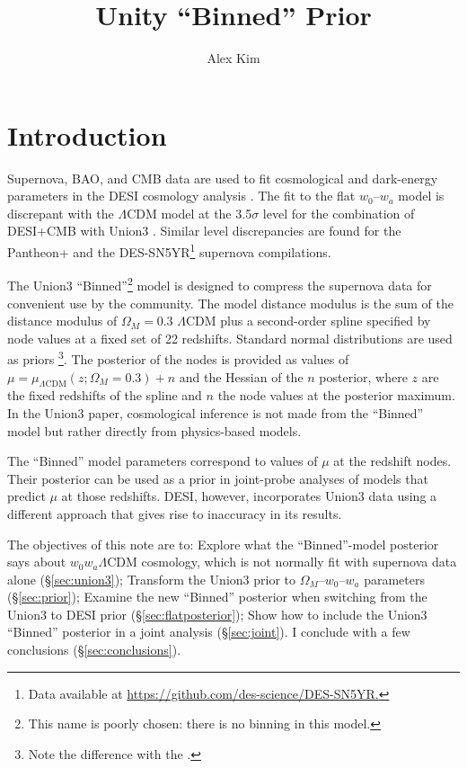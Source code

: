 \documentclass[11pt,a4paper]{article}
\title{Unity ``Binned'' Prior}
\author[a]{Alex Kim}
\affiliation[a]{Lawrence Berkeley National Laboratory}
\begin{document}
\maketitle

\section{Introduction}
Supernova, BAO, and CMB data are used to fit cosmological and dark-energy parameters in the DESI cosmology
analysis \cite{2024arXiv240403002D}.  The fit to the flat $w_0$--$w_a$ model is discrepant with the $\Lambda$CDM
model at the 3.5$\sigma$ level for the combination of DESI+CMB with Union3  \cite{2023arXiv231112098R}.
Similar level discrepancies are found for the Pantheon+ \cite{2022ApJ...938..113S} and the DES-SN5YR\footnote{Data available at \url{https://github.com/des-science/DES-SN5YR.}} supernova compilations.



The Union3 ``Binned''\footnote{This name is poorly chosen: there is no binning in this model.} model is designed to compress the  supernova data for convenient use by the community.  
The  model distance modulus
is the sum of the distance modulus of $\Omega_M=0.3$  $\Lambda$CDM plus a second-order spline specified by node values
at a fixed set of 22 redshifts.   Standard normal distributions are used as priors \footnote{Note the difference with the .}.  
The posterior of the nodes is provided  as values of
$\mu = \mu_{\Lambda \text{CDM}}(z;\Omega_M=0.3) + n$ and the Hessian of the $n$ posterior,
where $z$ are the fixed redshifts of the spline and $n$ the node values at the posterior maximum.
In the Union3 paper, cosmological inference is not made from the ``Binned'' model but rather directly from physics-based models.

The ``Binned'' model parameters correspond to values of $\mu$ at the redshift nodes.
Their  posterior can  be used as a prior in joint-probe analyses of models that predict $\mu$ at those redshifts. 
DESI, however, incorporates Union3 data using a different approach that gives rise to inaccuracy in its results.

The objectives of this note are to: Explore what the ``Binned''-model posterior says about $w_0w_a\Lambda$CDM cosmology, which is not normally
fit with  supernova data alone (\S\ref{sec:union3}); Transform the Union3 prior to $\Omega_M$--$w_0$--$w_a$ parameters
(\S\ref{sec:prior});
Examine the new ``Binned'' posterior when switching from the Union3 to DESI prior
(\S\ref{sec:flatposterior}); Show how to include the Union3 ``Binned'' posterior in a joint analysis (\S\ref{sec:joint}).
I conclude with a few conclusions (\S\ref{sec:conclusions}).
\end{document}

